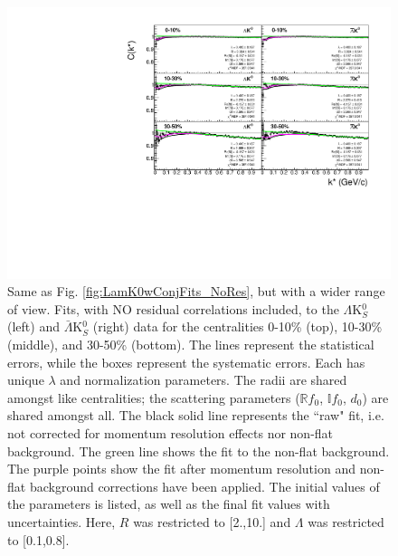 \documentclass[../AnalysisNoteJBuxton.tex]{subfiles}
\begin{document}
\begin{figure}[h]
  \centering
  \includegraphics[width=\textwidth]{7_ResultsAndDiscussion/Figures/canKStarCfwFitsLamK0wConj_0010_1030_3050UnZoomed_MomResCrctn_NonFlatBgdCrctn.pdf}
  \caption[$\Lambda$K$^{0}_{S}$($\bar{\Lambda}$K$^{0}_{S}$) Fits with No Residuals (Wide Range)]{Same as Fig. \ref{fig:LamK0wConjFits_NoRes}, but with a wider range of view.  
Fits, with NO residual correlations included, to the $\Lambda$K$^{0}_{S}$ (left) and $\bar{\Lambda}$K$^{0}_{S}$ (right) data for the centralities 0-10\% (top), 10-30\% (middle), and 30-50\% (bottom).
The lines represent the statistical errors, while the boxes represent the systematic errors.
Each has unique $\lambda$ and normalization parameters.
The radii are shared amongst like centralities; the scattering parameters ($\mathbb{R}f_{0}$, $\mathbb{I}f_{0}$, $d_{0}$) are shared amongst all.
The black solid line represents the ``raw" fit, i.e. not corrected for momentum resolution effects nor non-flat background.  
The green line shows the fit to the non-flat background.
The purple points show the fit after momentum resolution and non-flat background corrections have been applied.
The initial values of the parameters is listed, as well as the final fit values with uncertainties.
Here, $R$ was restricted to [2.,10.] and $\Lambda$ was restricted to [0.1,0.8].}
  \label{fig:LamK0wConjFitsUnZoomed_NoRes}
\end{figure}
\end{document}
